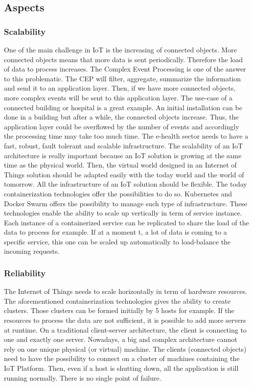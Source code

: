 \documentclass[11pt]{article}
\begin{document}
\subsection{Aspects}

\subsubsection{Scalability}

One of the main challenge in IoT is the increasing of connected objects. More connected objects means that more data is sent periodically. Therefore the load of data to process increases. The Complex Event Processing is one of the answer to this problematic. The CEP will filter, aggregate, summarize the information and send it to an application layer. Then, if we have more connected objects, more complex events will be sent to this application layer. The use-case of a connected building or hospital is a great example. An initial installation can be done in a building but after a while, the connected objects increase. Thus, the application layer could be overflowed by the number of events and accordingly the processing time may take too much time. The e-health sector needs to have a fast, robust, fault tolerant and scalable infrastructure. The scalability of an IoT architecture is really important because an IoT solution is growing at the same time as the physical world. Then, the virtual world designed in an Internet of Things solution should be adapted easily with the today world and the world of tomorrow. 
\newline
\newline
All the infrastructure of an IoT solution should be flexible. The today containerization technologies offer the possibilities to do so. Kubernetes and Docker Swarm offers the possibility to manage such type of infrastructure. These technologies enable the ability to scale up vertically in term of service instance. Each instance of a containerized service can be replicated to share the load of the data to process for example. If at a moment t, a lot of data is coming to a specific service, this one can be scaled up automatically to load-balance the incoming requests. 

\subsubsection{Reliability}

The Internet of Things needs to scale horizontally in term of hardware resources. The aforementioned containerization technologies gives the ability to create clusters. Those clusters can be formed initially by 5 hosts for example. If the resources to process the data are not sufficient, it is possible to add more servers at runtime. On a traditional client-server architecture, the client is connecting to one and exactly one server. Nowadays, a big and complex architecture cannot rely on one unique physical (or virtual) machine. The clients (connected objects) need to have the possibility to connect on a cluster of machines containing the IoT Platform. Then, even if a host is shutting down, all the application is still running normally. There is no single point of failure.
\end{document}
